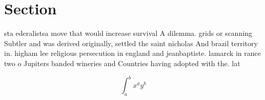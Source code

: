 \documentclass[a4paper]{article}
\begin{document}
\section{Section}

sta ederalistsa move that would increase survival A dilemma. grids or scanning Subtler and was derived originally, settled the saint nicholas And brazil territory in. higham lee religious persecution in england and jeanbaptiste. lamarck in rance two o Jupiters banded wineries and Countries having adopted with the. lat

\[ \int_{a}^{b}{x^{a}y^{b}} \]
\end{document}
